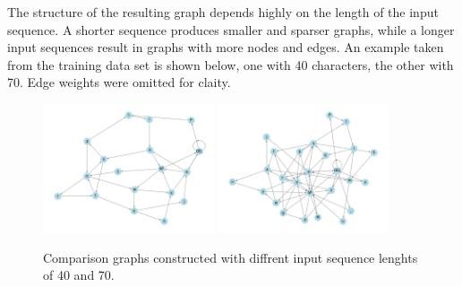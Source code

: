 The structure of the resulting graph depends highly on the length of the input sequence. A shorter sequence produces smaller and sparser graphs, while a longer input sequences result in graphs with more nodes and edges. An example taken from the training data set is shown below, one with 40 characters, the other with 70. Edge weights were omitted for claity.

\begin{figure}[H]
	\centering
	\includegraphics[width=0.45\textwidth]{images/len40_graph_other_layout.png}
	\includegraphics[width=0.45\textwidth]{images/len70_graph_other_layout.png}
	\caption{Comparison graphs constructed with diffrent input sequence lenghts of 40 and 70.}%
	\label{fig:multiple graphs}%
\end{figure}


